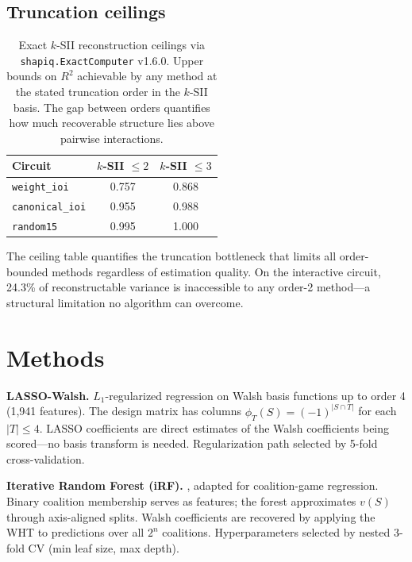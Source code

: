 \documentclass[10pt]{article}
\begin{document}
\subsection{Truncation ceilings}
\label{sec:ceilings}

\begin{table}[t]
\centering
\caption{Exact $k$-SII reconstruction ceilings via
\texttt{shapiq.ExactComputer} v1.6.0. Upper bounds on $R^2$
achievable by any method at the stated truncation order in the
$k$-SII basis. The gap between orders quantifies how much
recoverable structure lies above pairwise interactions.}
\label{tab:ceilings}
\begin{tabular}{lcc}
\toprule
Circuit & $k$-SII $\leq 2$ & $k$-SII $\leq 3$ \\
\midrule
\texttt{weight\_ioi} & 0.757 & 0.868 \\
\texttt{canonical\_ioi} & 0.955 & 0.988 \\
\texttt{random15} & 0.995 & 1.000 \\
\bottomrule
\end{tabular}
\end{table}

The ceiling table quantifies the truncation bottleneck that limits
all order-bounded methods regardless of estimation quality. On the
interactive circuit, 24.3\% of reconstructable variance is
inaccessible to any order-2 method---a structural limitation no
algorithm can overcome.


\section{Methods}
\label{sec:methods}

\textbf{LASSO-Walsh.}
$L_1$-regularized regression on Walsh basis functions up to order 4
(1{,}941 features). The design matrix has columns
$\phi_T(S) = (-1)^{|S \cap T|}$ for each $|T| \leq 4$. LASSO
coefficients are direct estimates of the Walsh coefficients being
scored---no basis transform is needed. Regularization path selected
by 5-fold cross-validation.

\textbf{Iterative Random Forest (iRF).}
\citet{basu2018iterative}, adapted for coalition-game regression.
Binary coalition membership serves as features; the forest
approximates $v(S)$ through axis-aligned splits. Walsh coefficients
are recovered by applying the WHT to predictions over all $2^n$
coalitions. Hyperparameters selected by nested 3-fold CV (min leaf
size, max depth).
\end{document}
